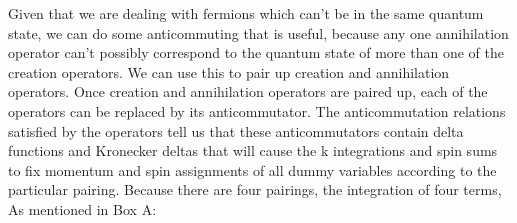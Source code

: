 \documentclass[a4]{article}
\begin{document}
\begin{framed}
            Given that we are dealing with fermions which can't be in the same quantum state, we can do some anticommuting that is useful, because
            any one annihilation operator can't possibly correspond to the quantum state of more than one of the creation operators. We can use this
            to pair up creation and annihilation operators. Once creation and annihilation operators are paired up, each of the operators can be 
            replaced by its anticommutator. The anticommutation relations satisfied by the operators tell us that these anticommutators contain delta
            functions and Kronecker deltas that will cause the k integrations and spin sums to fix momentum and spin assignments of all dummy variables
            according to the particular pairing. Because there are four pairings, the integration of four terms, As mentioned in Box A:


\end{framed}
\end{document}
